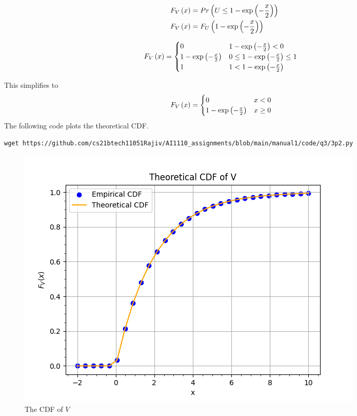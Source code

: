 \documentclass[journal,12pt,twocolumn]{IEEEtran}
\renewcommand\thesection{\arabic{section}}
\begin{document}
\begin{enumerate}[label=\thesection.\arabic*
,ref=\thesection.\theenumi]
\begin{align}
	F_V\left(x\right) &= Pr\left(U \le 1- \exp{\ensuremath{\left(-\frac{x}{2}\right)} }\right) \\
	F_V\left(x\right) &= F_U\left(1- \exp{\ensuremath{\left(-\frac{x}{2}\right)} }\right)		
\end{align}
\begin{small}
\begin{align}
	F_V\left(x\right) &=
    \begin{cases}  
        0 & 1- \exp{\ensuremath{\left(-\frac{x}{2}\right)} } < 0\\
        1- \exp{\ensuremath{\left(-\frac{x}{2}\right)} } & 0 \le 1- \exp{\ensuremath{\left(-\frac{x}{2}\right)} } \le 1 \\
        1 & 1 < 1- \exp{\ensuremath{\left(-\frac{x}{2}\right)} }
    \end{cases}
\end{align}
\end{small}
This simplifies to
\begin{align}
	F_V\left(x\right) &=
    \begin{cases}  
        0 & x < 0\\
        1- \exp{\ensuremath{\left(-\frac{x}{2}\right)}} & x \ge 0
    \end{cases}
    \label{eq:F_V}
\end{align}
The following code plots the theoretical CDF.
\begin{lstlisting}
wget https://github.com/cs21btech11051Rajiv/AI1110_assignments/blob/main/manual1/code/q3/3p2.py
\end{lstlisting}
\begin{figure}[ht!]
\centering
\includegraphics[width=\columnwidth]{./figs/fig3.2.png}
\caption{The CDF of $V$}
\label{fig:theory_misc_cdf}
\end{figure}
%
\end{enumerate}
%
\end{document}
